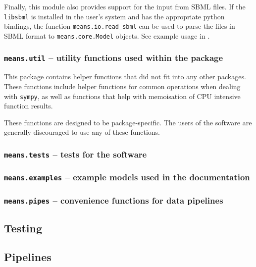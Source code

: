Finally, this module also provides support for the input from SBML files.
If the \verb`libsbml` is installed in the user's system and has the appropriate python bindings, the function \verb`means.io.read_sbml` can be used to parse the files in SBML format
to \verb`means.core.Model` objects. See example usage in .

\subsubsection{{\tt means.util} -- utility functions used within the package}
This package contains helper functions that did not fit into any other packages.
These functions include helper functions for common operations when dealing with \verb`sympy`,
as well as functions that help with memoisation of CPU intensive function results.

These functions are designed to be package-specific.
The users of the software are generally discouraged to use any of these functions.

\subsubsection{{\tt means.tests} -- tests for the software}
\subsubsection{{\tt means.examples} -- example models used in the documentation}
\subsubsection{{\tt means.pipes} -- convenience functions for data pipelines}

\subsection{Testing}
\subsection{Pipelines}

